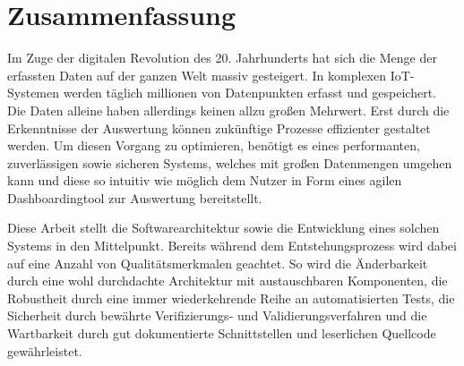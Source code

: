 \chapter*{Zusammenfassung}
\label{chap:zusammenfassung}

Im Zuge der digitalen Revolution des 20. Jahrhunderts hat sich die
Menge der erfassten Daten auf der ganzen Welt massiv gesteigert. In
komplexen IoT-Systemen werden täglich millionen von Datenpunkten
erfasst und gespeichert. Die Daten alleine haben allerdings keinen
allzu großen Mehrwert. Erst durch die Erkenntnisse der Auswertung
können zukünftige Prozesse effizienter gestaltet werden. Um diesen
Vorgang zu optimieren, benötigt es eines performanten, zuverlässigen 
sowie sicheren Systems, welches mit großen Datenmengen umgehen kann
und diese so intuitiv wie möglich dem Nutzer in Form eines agilen
Dashboardingtool zur Auswertung bereitstellt.

Diese Arbeit stellt die Softwarearchitektur sowie die Entwicklung
eines solchen Systems in den Mittelpunkt. Bereits während dem
Entstehungsprozess wird dabei auf eine Anzahl von Qualitätsmerkmalen
geachtet. So wird die Änderbarkeit durch eine wohl durchdachte Architektur
mit austauschbaren Komponenten, die Robustheit durch eine immer
wiederkehrende Reihe an automatisierten Tests, die Sicherheit durch bewährte
Verifizierungs- und Validierungsverfahren und die Wartbarkeit durch
gut dokumentierte Schnittstellen und leserlichen Quellcode gewährleistet.
